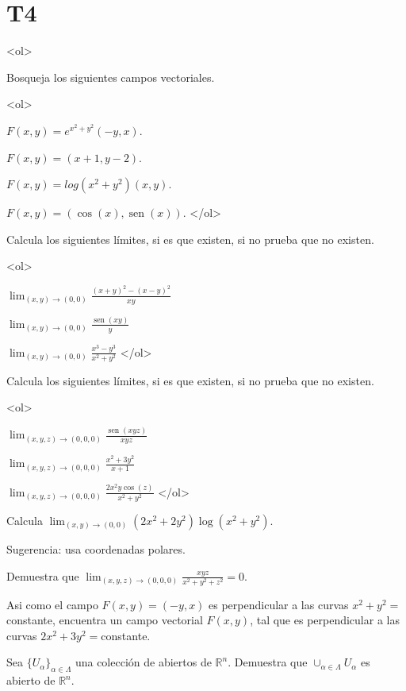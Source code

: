 \documentclass{article}
\theoremstyle{definition}
\newcommand{\sen}{\operatorname{sen}}
\begin{document}
  \section*{T4}
  
  
  
  <ol>

	\item Bosqueja los siguientes campos vectoriales.

	
	<ol>
	\item $F(x,y)=e^{x^2+y^2}(-y,x)$.
	\item $F(x,y)=(x+1,y-2)$.
	\item $F(x,y)=log(x^2+y^2)(x,y)$.
	\item $F(x,y)=(\cos(x),\sen(x))$.
	</ol>


  \item Calcula los siguientes límites, si es que existen, si no prueba que no existen.
  
  <ol>
  \item $\lim_{(x,y)\to (0,0)} \frac{(x+y)^2-(x-y)^2}{xy}$
  \item $\lim_{(x,y)\to (0,0)} \frac{\sen(xy)}{y}$
  \item $\lim_{(x,y)\to (0,0)} \frac{x^3-y^3}{x^2+y^2}$
  </ol>
  
  \item Calcula los siguientes límites, si es que existen, si no prueba que no existen.


	<ol>
	\item $\lim_{(x,y,z)\to (0,0,0)}\frac{\sen(xyz)}{xyz}$
	\item $\lim_{(x,y,z) \to (0,0,0)} \frac{x^2+3y^2}{x+1}$
	\item $\lim_{(x,y,z)\to (0,0,0)} \frac{2x^2y\cos(z)}{x^2+y^2}$
</ol>	  
  
  
  \item Calcula $\lim_{(x,y)\to (0,0)} (2x^2+2y^2)\log(x^2+y^2)$.
  
  Sugerencia: usa coordenadas polares.

  \item Demuestra que $\lim_{(x,y,z)\to (0,0,0)}\frac{xyz}{x^2+y^2+z^2}=0$.

\item Asi como el campo $F(x,y)=(-y,x)$ es perpendicular a las curvas $x^2+y^2=$constante, encuentra un campo vectorial $F(x,y)$, tal que es perpendicular a las curvas $2x^2+3y^2=$constante.


\item Sea $\{U_\alpha\}_{\alpha \in \Lambda}$ una colección de abiertos de $\mathbb{R}^n$. Demuestra que
$\cup_{\alpha \in \Lambda}U_\alpha$ es abierto de $\mathbb{R}^n$.
\end{document}
